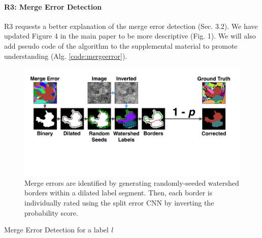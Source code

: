\documentclass[10pt,twocolumn,letterpaper]{article}
\begin{document}
\paragraph{R3: Merge Error Detection}
R3 requests a better explanation of the merge error detection (Sec. 3.2). We have updated Figure 4 in the main paper to be more descriptive (Fig. 1). We will also add pseudo code of the algorithm to the supplemental material to promote understanding (Alg. \ref{code:mergeerror}).

\begin{figure}[h]
\centering
\includegraphics[width=\linewidth]{gfx/merge_error_v6.pdf}
\caption{Merge errors are identified by generating randomly-seeded watershed borders within a dilated label segment. Then, each border is individually rated using the split error CNN by inverting the probability score.}
\label{fig:merge_error}
\end{figure}

%

\begin{algorithm}
\caption{Merge Error Detection for a label \emph{l}}\label{code:mergeerror}
\begin{algorithmic}[1]
	\EndFor

\end{algorithmic}
\end{algorithm}
\end{document}
